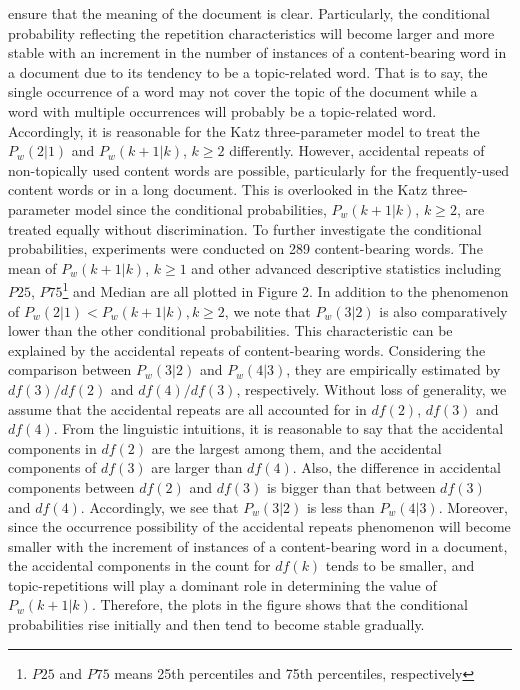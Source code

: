 \documentclass[english]{jnlp_1.4_rep}
\begin{document}
ensure that the meaning of the document is clear. Particularly, the conditional probability reflecting the repetition characteristics will become
larger and more stable with an increment in the number of instances of a content-bearing word in a document due to its tendency to be a
topic-related word. That is to say, the single occurrence of a word may not cover the topic of the document while a word with multiple occurrences
will probably be a topic-related word. Accordingly, it is reasonable for the Katz three-parameter model to treat the $P_{w}(2|1)$ and
$P_{w}(k+1|k)$, $k\geq 2$ differently. However, accidental repeats of non-topically used content words are possible, particularly for the
frequently-used content words or in a long document. This is overlooked in the Katz three-parameter model since the conditional probabilities,
$P_{w}(k+1|k)$, $k\geq 2$, are treated equally without discrimination. To further investigate the conditional probabilities, experiments were conducted
on 289 content-bearing words. The mean of $P_{w}(k+1 \vert k)$, $k\ge 1 $ and other advanced descriptive statistics including $\mathit{P25}$,
$\mathit{P75}$\footnote{$\mathit{P25}$ and $\mathit{P75}$ means 25th percentiles and 75th percentiles, respectively} and Median are all plotted in
Figure 2. In addition to the phenomenon of $P_{w}(2|1)<P_{w}(k+1|k),k\geq 2$, we note that $P_{w}(3|2)$ is also comparatively lower than the other
conditional probabilities. This characteristic can be explained by the accidental repeats of content-bearing words. Considering the comparison
between $P_{w}(3|2)$ and $P_{w}(4|3)$, they are empirically estimated by $\mathit{df}(3) / \mathit{df}(2)$ and $\mathit{df}(4) / \mathit{df}(3)$,
respectively. Without loss of generality, we assume that the accidental repeats are all accounted for in $\mathit{df}(2)$, $\mathit{df}(3)$ and
$\mathit{df}(4)$. From the linguistic intuitions, it is reasonable to say that the accidental components in $\mathit{df}(2)$ are the largest among
them, and the accidental components of $\mathit{df}(3)$ are larger than $\mathit{df}(4)$. Also, the difference in accidental components between
$\mathit{df}(2)$ and $\mathit{df}(3)$ is bigger than that between $\mathit{df}(3)$ and $\mathit{df}(4)$. Accordingly, we see that $P_{w}(3|2)$ is
less than $P_{w}(4|3)$. Moreover, since the occurrence possibility of the accidental repeats phenomenon will become smaller with the increment of
instances of a content-bearing word in a document, the accidental components in the count for $\mathit{df}(k)$ tends to be smaller, and
topic-repetitions will play a dominant role in determining the value of $P_{w}(k+1|k)$. Therefore, the plots in the figure shows that the
conditional probabilities rise initially and then tend to become stable gradually.
\end{document}
